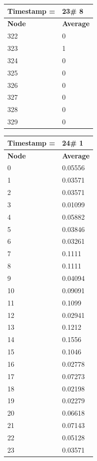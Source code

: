 \begin{tabular}{|l||l|}
\hline
\textbf{Timestamp =} & \textbf{23}\# 8\\\hline
	\textbf{Node} & \textbf{Average} \\ \hline
\hline
	322 & 0 \\ \hline
	323 & 1 \\ \hline
	324 & 0 \\ \hline
	325 & 0 \\ \hline
	326 & 0 \\ \hline
	327 & 0 \\ \hline
	328 & 0 \\ \hline
	329 & 0 \\ \hline
\end{tabular}

\begin{tabular}{|l||l|}
\hline
\textbf{Timestamp =} & \textbf{24}\# 1\\\hline
	\textbf{Node} & \textbf{Average} \\ \hline
\hline
	0 & 0.05556 \\ \hline
	1 & 0.03571 \\ \hline
	2 & 0.03571 \\ \hline
	3 & 0.01099 \\ \hline
	4 & 0.05882 \\ \hline
	5 & 0.03846 \\ \hline
	6 & 0.03261 \\ \hline
	7 & 0.1111 \\ \hline
	8 & 0.1111 \\ \hline
	9 & 0.04094 \\ \hline
	10 & 0.09091 \\ \hline
	11 & 0.1099 \\ \hline
	12 & 0.02941 \\ \hline
	13 & 0.1212 \\ \hline
	14 & 0.1556 \\ \hline
	15 & 0.1046 \\ \hline
	16 & 0.02778 \\ \hline
	17 & 0.07273 \\ \hline
	18 & 0.02198 \\ \hline
	19 & 0.02279 \\ \hline
	20 & 0.06618 \\ \hline
	21 & 0.07143 \\ \hline
	22 & 0.05128 \\ \hline
	23 & 0.03571 \\ \hline

\end{tabular}
